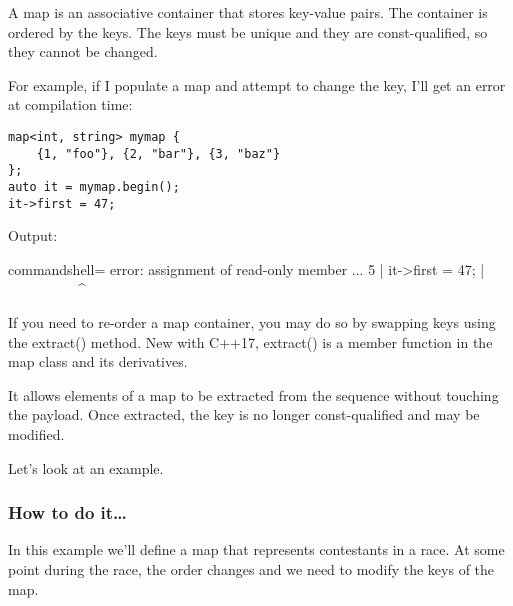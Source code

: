 
A map is an associative container that stores key-value pairs. The container is ordered by the keys. The keys must be unique and they are const-qualified, so they cannot be changed.

For example, if I populate a map and attempt to change the key, I'll get an error at compilation time:

\begin{lstlisting}[style=styleCXX]
map<int, string> mymap {
	{1, "foo"}, {2, "bar"}, {3, "baz"}
};
auto it = mymap.begin();
it->first = 47;
\end{lstlisting}

Output:

\begin{tcblisting}{commandshell={}}
error: assignment of read-only member ...
5 | it->first = 47;
  |  ~~~~~~~~~~^~~~
\end{tcblisting}

If you need to re-order a map container, you may do so by swapping keys using the extract() method. New with C++17, extract() is a member function in the map class and its derivatives.

It allows elements of a map to be extracted from the sequence without touching the payload. Once extracted, the key is no longer const-qualified and may be modified.

Let's look at an example.

\subsubsection{How to do it…}

In this example we'll define a map that represents contestants in a race. At some point during the race, the order changes and we need to modify the keys of the map.

